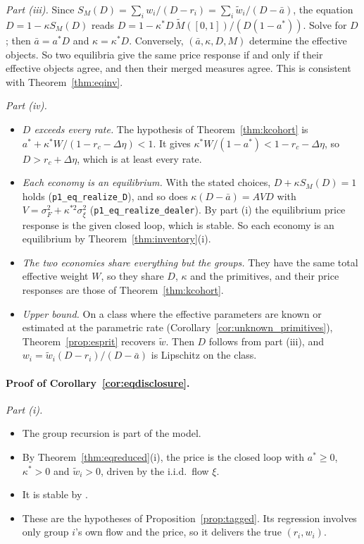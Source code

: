 \documentclass[12pt]{article}
\theoremstyle{definition}
\theoremstyle{remark}
\begin{document}
\emph{Part (iii).} Since $S_M(D)=\sum_iw_i/(D-r_i)=\sum_i\tilde w_i/(D-\bar a)$, the equation $D=1-\kappa S_M(D)$ reads $D=1-\kappa^*D\,\tilde M([0,1])/(D(1-a^*))$. Solve for $D$; then $\bar a=a^*D$ and $\kappa=\kappa^*D$. Conversely, $(\bar a,\kappa,D,M)$ determine the effective objects. So two equilibria give the same price response if and only if their effective objects agree, and then their merged measures agree. This is consistent with Theorem~\ref{thm:eqinv}.

\emph{Part (iv).}
\begin{itemize}[itemsep=1pt,topsep=2pt]
\item \emph{$D$ exceeds every rate.} The hypothesis of Theorem~\ref{thm:kcohort} is $a^*+\kappa^*W/(1-r_c-\Delta\eta)<1$. It gives $\kappa^*W/(1-a^*)<1-r_c-\Delta\eta$, so $D>r_c+\Delta\eta$, which is at least every rate.
\item \emph{Each economy is an equilibrium.} With the stated choices, $D+\kappa S_M(D)=1$ holds (\nolinkurl{p1_eq_realize_D}), and so does $\kappa(D-\bar a)=AVD$ with $V=\sigma_F^2+\kappa^{*2}\sigma_\xi^2$ (\nolinkurl{p1_eq_realize_dealer}). By part (i) the equilibrium price response is the given closed loop, which is stable. So each economy is an equilibrium by Theorem~\ref{thm:inventory}(i).
\item \emph{The two economies share everything but the groups.} They have the same total effective weight $W$, so they share $D$, $\kappa$ and the primitives, and their price responses are those of Theorem~\ref{thm:kcohort}.
\item \emph{Upper bound.} On a class where the effective parameters are known or estimated at the parametric rate (Corollary~\ref{cor:unknown_primitives}), Theorem~\ref{prop:esprit} recovers $\tilde w$. Then $D$ follows from part (iii), and $w_i=\tilde w_i(D-r_i)/(D-\bar a)$ is Lipschitz on the class.
\end{itemize}

\paragraph{Proof of Corollary~\ref{cor:eqdisclosure}.}
\emph{Part (i).}
\begin{itemize}[itemsep=1pt,topsep=2pt]
\item The group recursion is part of the model.
\item By Theorem~\ref{thm:eqreduced}(i), the price is the closed loop with $a^*\ge0$, $\kappa^*>0$ and $\tilde w_i>0$, driven by the i.i.d.\ flow $\xi$.
\item It is stable by \citet[their Theorem~S9.2(iv)]{niroula2026full}.
\item These are the hypotheses of Proposition~\ref{prop:tagged}. Its regression involves only group $i$'s own flow and the price, so it delivers the true $(r_i,w_i)$.
\end{itemize}
\end{document}
